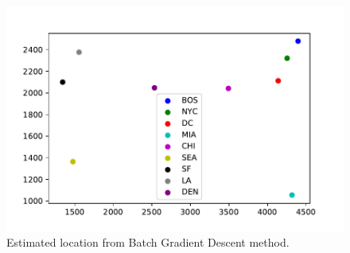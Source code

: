 \documentclass[twoside,11pt]{homework}
\begin{document}
\begin{figure}[ht]
\centering
\includegraphics[]{EstimatedLocation.pdf}
\caption{Estimated location from Batch Gradient Descent method.}
\label{EstiLoc}
\end{figure}
%
\end{document}
